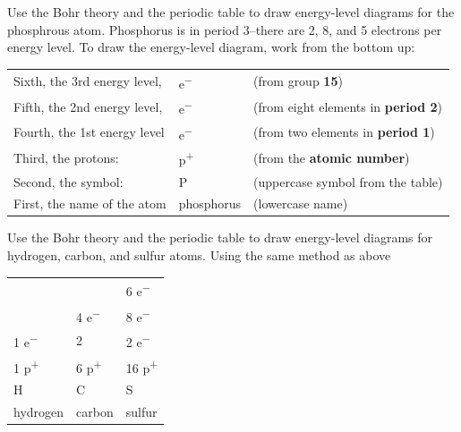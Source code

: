 \begin{sample}{Use the Bohr theory and the periodic table to draw energy-level diagrams for
    the phosphrous atom.}
    Phosphorus is in period 3--there are 2, 8, and 5 electrons per energy level. To draw
    the energy-level diagram, work from the bottom up:
    \begin{table}[!ht]
        \centering
        \setlength{\tabcolsep}{12pt}      %
        \renewcommand{\arraystretch}{1.2} %
        \begin{tabularx}{\textwidth}{
                >{\hsize=0.4\hsize}X
                >{\hsize=0.1\hsize}X
                >{\hsize=0.5\hsize}X
            }
            Sixth, the 3rd energy level, & 5 \si{e^-} & (from group \textbf{15})\\
            Fifth, the 2nd energy level, & 8 \si{e^-} & (from eight elements in \textbf{period 2})\\
            Fourth, the 1st energy level & 2 \si{e^-} & (from two elements in \textbf{period 1})\\
            Third, the protons: & 15 \si{p^+} & (from the \textbf{atomic number})\\
            Second, the symbol: & P & (uppercase symbol from the table)\\
            First, the name of the atom & phosphorus & (lowercase name)
        \end{tabularx}
    \end{table}
\end{sample}

\begin{sample}{Use the Bohr theory and the periodic table to draw energy-level diagrams for
    hydrogen, carbon, and sulfur atoms.}
    Using the same method as above
    \begin{table}[!ht]
        \centering
        \setlength{\tabcolsep}{12pt}      %
        \renewcommand{\arraystretch}{1.2} %
        \begin{tabularx}{\textwidth}{X X X}
             & & 6 \si{e^-} \\
             & 4 \si{e^-} & 8 \si{e^-} \\
            1 \si{e^-} & 2 & 2 \si{e^-} \\
            1 \si{p^+} & 6 \si{p^+} & 16 \si{p^+} \\
            H & C & S \\
            hydrogen & carbon & sulfur
        \end{tabularx}
    \end{table}
\end{sample}

